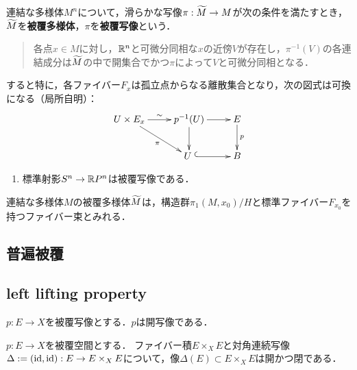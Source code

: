 \documentclass[uplatex,dvipdfmx]{jsreport}
\begin{document}
\begin{definition}
    連結な多様体$M^n$について，滑らかな写像$\pi:\widetilde{M}\to M$が次の条件を満たすとき，$\widetilde{M}$を\textbf{被覆多様体}，$\pi$を\textbf{被覆写像}という．
    \begin{quote}
        各点$x\in M$に対し，$\mathbb{R}^n$と可微分同相な$x$の近傍$V$が存在し，$\pi^{-1}(V)$の各連結成分は$\widetilde{M}$の中で開集合でかつ$\pi$によって$V$と可微分同相となる．
    \end{quote}
\end{definition}
\begin{remarks}
    すると特に，各ファイバー$F_x$は孤立点からなる離散集合となり，次の図式は可換になる（局所自明）：
    \[\xymatrix{
        U\times E_x\ar[r]^-\sim\ar[dr]_-\pi&p^{-1}(U)\ar[d]\ar[r]&E\ar[d]^-{p}\\
        &U \;\ar@{^{(}->}[r]&B
    }\]
\end{remarks}

\begin{example}\mbox{}
    \begin{enumerate}
        \item 標準射影$S^n\to\mathbb{R} P^n$は被覆写像である．
    \end{enumerate}
\end{example}

\begin{theorem}
    連結な多様体$M$の被覆多様体$\widetilde{M}$は，構造群$\pi_1(M,x_0)/H$と標準ファイバー$F_{x_0}$を持つファイバー束とみれる．
\end{theorem}

\subsection{普遍被覆}

\subsection{left lifting property}

\begin{proposition}
    $p:E\to X$を被覆写像とする．$p$は開写像である．
\end{proposition}

\begin{lemma}
    $p:E\to X$を被覆空間とする．
    ファイバー積$E\times_XE$と対角連続写像$\Delta:=(\mathrm{id},\mathrm{id}):E\to E\times_XE$について，像$\Delta(E)\subset E\times_XE$は開かつ閉である．
\end{lemma}
\end{document}

